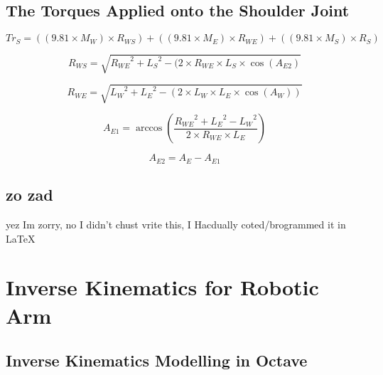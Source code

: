 \documentclass[12pt]{article}
\begin{document}
\subsection{The Torques Applied onto the Shoulder Joint}
\begin{equation}
Tr_S = ((9.81 \times {M_W}) \times {R_{WS}}) + ((9.81 \times M_E)\times R_{WE})+((9.81 \times M_S)\times R_S)
\end{equation}

\begin{equation}
R_{WS}=\sqrt{{R_{WE}}^2+{L_S}^2-(2 \times {R_{WE}} \times {L_S} \times \cos(A_{E 2})}
\end{equation}

\begin{equation}
R_{WE}=\sqrt{{L_W}^2+{L_E}^2-(2 \times {L_W} \times {L_E} \times \cos({A_W}))}
\end{equation}

\begin{equation}
A_{E 1}=\arccos(\frac{{R_{WE}}^2+{L_E}^2-{L_W}^2}{{2}\times{R_{WE}}\times{L_E}})
\end{equation}

\begin{equation}
A_{E 2} = {A_E} - {A_{E 1}}
\end{equation}

\subsection{zo zad}
yez Im zorry, no I didn't chust vrite this, I Hacdually coted/brogrammed it in LaTeX

\section{Inverse Kinematics for Robotic Arm}

\subsection{Inverse Kinematics Modelling in Octave}
\end{document}
